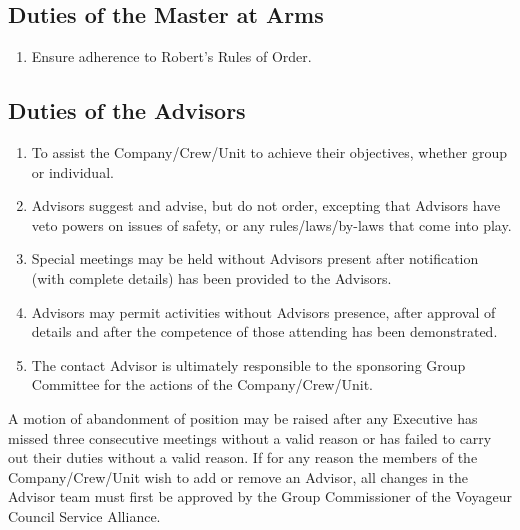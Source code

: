 \subsection{Duties of the Master at Arms}\label{subsec:duties-of-the-master-at-arms}
\begin{enumerate}
    \item Ensure adherence to Robert's Rules of Order.
\end{enumerate}

\subsection{Duties of the Advisors}\label{subsec:duties-of-the-advisors}
\begin{enumerate}
    \item To assist the Company/Crew/Unit to achieve their objectives, whether group or individual.
    \item Advisors suggest and advise, but do not order, excepting that Advisors have veto powers on issues of safety, or any rules/laws/by-laws that come into play.
    \item Special meetings may be held without Advisors present after notification (with complete details) has been provided to the Advisors.
    \item Advisors may permit activities without Advisors presence, after approval of details and after the competence of those attending has been demonstrated.
    \item The contact Advisor is ultimately responsible to the sponsoring Group Committee for the actions of the Company/Crew/Unit.
\end{enumerate}
A motion of abandonment of position may be raised after any Executive has missed three consecutive meetings without a valid reason or has failed to carry out their duties without a valid reason.
If for any reason the members of the Company/Crew/Unit wish to add or remove an Advisor, all changes in the Advisor team must first be approved by the Group Commissioner of the Voyageur Council Service Alliance.